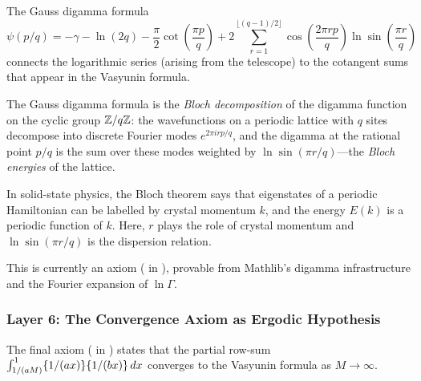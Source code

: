 \documentclass[11pt,a4paper]{article}
\begin{document}
The Gauss digamma formula
\[
  \psi(p/q) = -\gamma - \ln(2q) - \frac{\pi}{2}\cot\left(\frac{\pi p}{q}\right)
  + 2\sum_{r=1}^{\lfloor(q-1)/2\rfloor} \cos\left(\frac{2\pi rp}{q}\right)
  \ln\sin\left(\frac{\pi r}{q}\right)
\]
connects the logarithmic series (arising from the telescope) to the
cotangent sums that appear in the Vasyunin formula.

\begin{correspondence}
The Gauss digamma formula is the \emph{Bloch decomposition} of the
digamma function on the cyclic group $\mathbb{Z}/q\mathbb{Z}$: the wavefunctions on
a periodic lattice with $q$ sites decompose into discrete Fourier
modes $e^{2\pi irp/q}$, and the digamma at the rational point $p/q$
is the sum over these modes weighted by $\ln\sin(\pi r/q)$---the
\emph{Bloch energies} of the lattice.

In solid-state physics, the Bloch theorem says that eigenstates of
a periodic Hamiltonian can be labelled by crystal momentum $k$,
and the energy $E(k)$ is a periodic function of $k$. Here,
$r$ plays the role of crystal momentum and $\ln\sin(\pi r/q)$
is the dispersion relation.

This is currently an axiom ( in
), provable from Mathlib's digamma
infrastructure and the Fourier expansion of $\ln\Gamma$.
\end{correspondence}

\subsubsection{Layer 6: The Convergence Axiom as Ergodic Hypothesis}

The final axiom ( in
) states that the partial row-sum
$\int_{1/(aM)}^1 \{1/(ax)\}\{1/(bx)\}\,dx$ converges
to the Vasyunin formula as $M \to \infty$.
\end{document}
